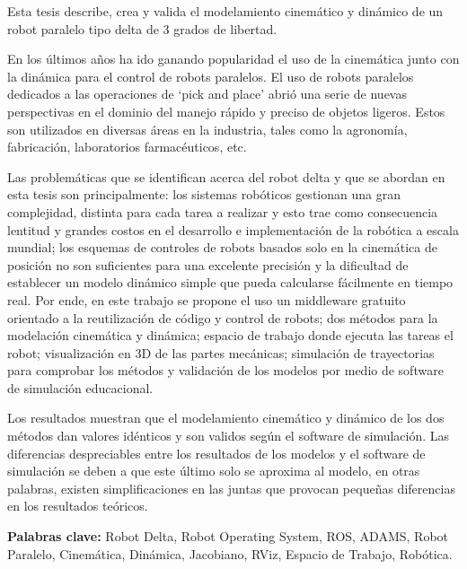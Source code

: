 \thispagestyle{fancy}
\vspace{5mm}

Esta tesis describe, crea y valida el modelamiento cinemático y dinámico de un robot paralelo tipo delta de 3 grados de libertad. 

En los últimos años ha ido ganando popularidad el uso de la cinemática junto con la dinámica para el control de robots paralelos. El uso de robots paralelos dedicados a las operaciones de ‘pick and place’ abrió una serie de nuevas perspectivas en el dominio del manejo rápido y preciso de objetos ligeros. Estos son utilizados en diversas áreas en la industria, tales como la agronomía, fabricación, laboratorios farmacéuticos, etc.

Las problemáticas que se identifican acerca del robot delta y que se abordan en esta tesis son principalmente: los sistemas robóticos gestionan una gran complejidad, distinta para cada tarea a realizar y esto trae como consecuencia lentitud y grandes costos en el desarrollo  e implementación de la robótica a escala mundial; los esquemas de controles de robots basados solo en la cinemática de posición no son suficientes para una excelente precisión y  la dificultad de establecer un modelo dinámico simple que pueda calcularse fácilmente en tiempo real. Por ende, en este trabajo se propone el uso un middleware gratuito orientado a la reutilización de código y control de robots; dos métodos para la modelación cinemática y dinámica; espacio de trabajo donde ejecuta las tareas el robot; visualización en 3D de las partes mecánicas; simulación de trayectorias para comprobar los métodos y validación de los modelos por medio de software de simulación educacional.  

Los resultados muestran que el modelamiento cinemático y dinámico de los dos métodos dan valores idénticos y son validos según el software de simulación. Las diferencias despreciables entre los resultados de los modelos y el software de simulación se deben a que este último solo se aproxima al modelo, en otras palabras, existen simplificaciones en las juntas que provocan pequeñas diferencias en los resultados teóricos.

\vfill
\noindent\textbf{Palabras clave:} Robot Delta, Robot Operating System, ROS, ADAMS, Robot Paralelo, Cinemática, Dinámica, Jacobiano, RViz, Espacio de Trabajo, Robótica.
